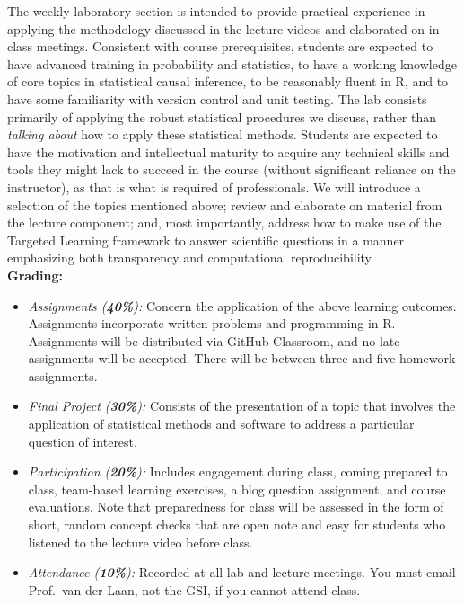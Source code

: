 \documentclass[11pt]{article}
\begin{document}
The weekly laboratory section is intended to provide practical experience in
applying the methodology discussed in the lecture videos and elaborated on in
class meetings. Consistent with course prerequisites, students are expected to
have advanced training in probability and statistics, to have a working
knowledge of core topics in statistical causal inference, to be reasonably
fluent in R, and to have some familiarity with version control and unit testing.
The lab consists primarily of applying the robust statistical procedures we
discuss, rather than \textit{talking about} how to apply these statistical
methods. Students are expected to have the motivation and intellectual maturity
to acquire any technical skills and tools they might lack to succeed in the
course (without significant reliance on the instructor), as that is what is
required of professionals. We will introduce a selection of the topics mentioned
above; review and elaborate on material from the lecture component; and, most
importantly, address how to make use of the Targeted Learning framework to
answer scientific questions in a manner emphasizing both transparency and
computational reproducibility. \\

\textbf {\large Grading:}
\begin{itemize}
  \item \textit{Assignments (\textbf{40\%}):} Concern the application of the
    above learning outcomes. Assignments incorporate written problems and
    programming in R. Assignments will be distributed via GitHub Classroom, and
    no late assignments will be accepted. There will be between three and five
    homework assignments.
  \item \textit{Final Project (\textbf{30\%}):} Consists of the presentation of
    a topic that involves the application of statistical methods and software to
    address a particular question of interest.
  \item \textit{Participation (\textbf{20\%}):} Includes engagement during
    class, coming prepared to class, team-based learning exercises, a blog
    question assignment, and course evaluations. Note that preparedness for
    class will be assessed in the form of short, random concept checks that are
    open note and easy for students who listened to the lecture video before
    class.
  \item \textit{Attendance (\textbf{10\%}):} Recorded at all lab and lecture
    meetings. You must email Prof.~van der Laan, not the GSI, if you cannot
    attend class. \\
\end{itemize}
\end{document}
